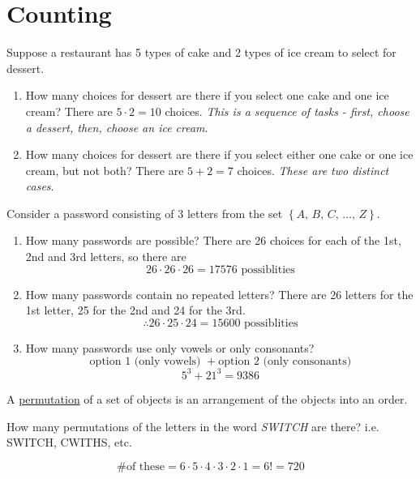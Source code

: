 \section{Counting}
\begin{example}
    Suppose a restaurant has 5 types of cake and 2 types of ice cream to select for dessert.
    \begin{enumerate}
        \item How many choices for dessert are there if you select one cake and one ice cream?
        There are $5\cdot 2 = 10$ choices. \emph{This is a sequence of tasks - first, choose a dessert, then, choose an ice cream}.
        \item How many choices for dessert are there if you select either one cake or one ice cream, but not both?
        There are $5 + 2 = 7$ choices. \emph{These are two distinct cases}.
    \end{enumerate}
\end{example}

\begin{example}
    Consider a password consisting of 3 letters from the set $\left\{A,\,B,\,C,\,\dots,\,Z\right\}$.
    \begin{enumerate}
        \item How many passwords are possible?
        There are 26 choices for each of the 1st, 2nd and 3rd letters, so there are $$26\cdot 26\cdot 26 = 17576 \text{ possiblities}$$
        \item How many passwords contain no repeated letters?
        There are 26 letters for the 1st letter, 25 for the 2nd and 24 for the 3rd.
        $$\therefore 26\cdot 25\cdot 24 = 15600 \text{ possiblities}$$
        \item How many passwords use only vowels or only consonants?
        $$\text{option } 1 \text{ (only vowels) } + \text{option } 2\text{ (only consonants)}$$
        $$5^3 + 21^3 = 9386$$
    \end{enumerate}
\end{example}

\begin{definition}
    A \underline{permutation} of a set of objects is an arrangement of the objects into an order.
\end{definition}

\begin{example}
    How many permutations of the letters in the word \emph{SWITCH} are there? i.e. SWITCH, CWITHS, etc.

    $$\text{\# of these} = 6\cdot 5\cdot 4\cdot 3\cdot 2\cdot 1 = 6! = 720$$
\end{example}

